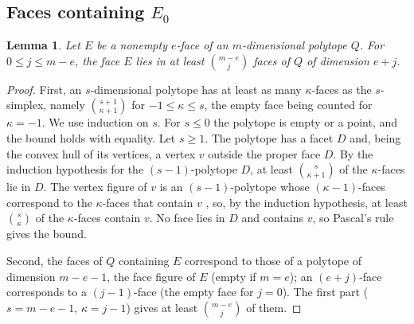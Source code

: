 \documentclass[11pt]{article}
\newtheorem{lemma}[theorem]{Lemma}
\theoremstyle{definition}
\theoremstyle{remark}
\begin{document}
\subsection{Faces containing \texorpdfstring{$E_0$}{E0}}
\begin{lemma}\label{lem:coface-count}
Let $E$ be a nonempty $e$-face of an $m$-dimensional polytope $Q$. For
$0\leq j\leq m-e$, the face $E$ lies in at least $\binom{m-e}{j}$ faces
of $Q$ of dimension $e+j$.
\end{lemma}
\begin{proof}
First, an $s$-dimensional polytope has at least as many $\kappa$-faces
as the $s$-simplex, namely $\binom{s+1}{\kappa+1}$ for $-1\leq\kappa\leq s$, the empty face being counted for $\kappa=-1$. We use induction on $s$. For $s\leq0$ the polytope is empty or a point, and the bound holds with equality. Let $s\geq1$. The polytope has a facet $D$ and, being the convex hull of its vertices, a vertex $v$ outside the proper face $D$. By the induction hypothesis for the $(s-1)$-polytope $D$, at least $\binom{s}{\kappa+1}$ of the $\kappa$-faces lie in $D$. The vertex figure of $v$ is an $(s-1)$-polytope whose $(\kappa-1)$-faces correspond to the $\kappa$-faces that contain $v$ \cite[Proposition~2.4]{Ziegler}, so, by the induction hypothesis, at least $\binom{s}{\kappa}$ of the $\kappa$-faces contain $v$. No face lies in $D$ and contains $v$, so Pascal's rule gives the bound.

Second, the faces of $Q$ containing $E$ correspond to those of a
polytope of dimension $m-e-1$, the face figure of $E$
\cite[Chapter~2]{Ziegler} (empty if $m=e$); an $(e+j)$-face corresponds to
a $(j-1)$-face (the empty face for $j=0$).
The first part ($s=m-e-1$, $\kappa=j-1$) gives at least
$\binom{m-e}{j}$ of them.
\end{proof}
\end{document}
